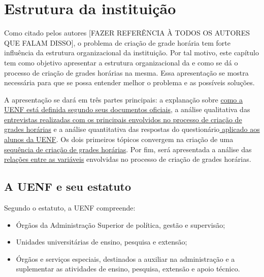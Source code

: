 \chapter{Estrutura da instituição} \label{chap:instituicao} %

Como citado pelos autores [FAZER REFERÊNCIA À TODOS OS AUTORES QUE FALAM DISSO], o problema de criação de grade horária tem forte influência da estrutura organizacional da instituição. Por tal motivo, este capítulo tem como objetivo apresentar a estrutura organizacional da  e como se dá o processo de criação de grades horárias na mesma. Essa apresentação se mostra necessária para que se possa entender melhor o problema e as possíveis soluções.

A apresentação se dará em três partes principais: a explanação sobre \hyperref[sec:estatuto]{como a UENF está definida segundo seus documentos oficiais}, a análise qualitativa das \hyperref[sec:entrevistas]{entrevistas realizadas com os principais envolvidos no processo de criação de grades horárias} e a análise quantitativa das respostas do questionário\hyperref[sec:formulario]{ aplicado aos alunos da UENF}. Os dois primeiros tópicos convergem na criação de uma \hyperref[sec:sequencia]{sequência de criação de grades horárias}. Por fim, será apresentada a análise das \hyperref[sec:relacoes]{relações entre as variáveis} envolvidas no processo de criação de grades horárias.


\section{A UENF e seu estatuto} \label{sec:estatuto} %


Segundo o estatuto, a UENF compreende:

\begin{itemize}
  \item Órgãos da Administração Superior de política, gestão e supervisão;
  \item Unidades universitárias de ensino, pesquisa e extensão;
  \item Órgãos e serviços especiais, destinados a auxiliar na administração e a suplementar as atividades de ensino, pesquisa, extensão e apoio técnico.
\end{itemize}

